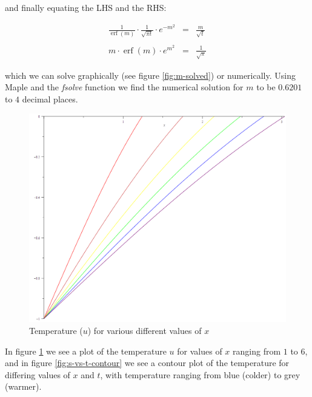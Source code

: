 \documentclass{report}
\DeclareMathOperator{\erf}{erf}
\begin{document}
and finally equating the LHS and the RHS:\bigskip

\begin{eqnarray*}
\frac{1}{\erf(m)} \cdot \frac{1}{ \sqrt{\pi t} } \cdot e^{-m^2} & = & \frac{m}{ \sqrt{t} } \\\\
                                  m \cdot \erf(m) \cdot e^{m^2} & = & \frac{1}{ \sqrt{\pi} }
\end{eqnarray*}\medskip

which we can solve graphically (see figure \ref{fig:m-solved}) or numerically. Using Maple and the 
\emph{fsolve} function we find the numerical solution for $m$ to be $0.6201$ to $4$ decimal places.\bigskip

\begin{figure}[H]
\centering
\includegraphics[scale = 0.15]{u-vs-x}
\caption{Temperature ($u$) for various different values of $x$}
\label{fig:u-vs-x}
\end{figure}

In figure \ref{fig:u-vs-x} we see a plot of the temperature $u$ for values of $x$ ranging from $1$ to $6$, 
and in figure \ref{fig:s-vs-t-contour} we see a contour plot of the temperature for differing values of $x$ 
and $t$, with temperature ranging from blue (colder) to grey (warmer).\bigskip
\end{document}
